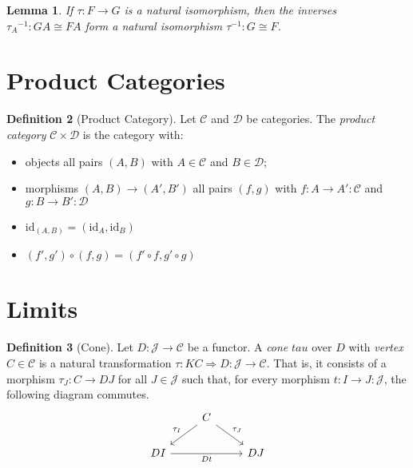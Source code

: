 \documentclass{book}
\newtheorem{lm}{Lemma}[chapter]
\theoremstyle{definition}
\newtheorem{df}[lm]{Definition}
\newcommand{\id}[1]{\ensuremath{\mathrm{id}_{#1}}}
\newcommand{\inv}[1]{\ensuremath{{#1}^{-1}}}
\begin{document}
  \begin{lm}
    If $\tau : F \rightarrow G$ is a natural isomorphism, then the inverses 
    $\inv{\tau_A} : GA \cong FA$ form a natural isomorphism $\inv{\tau} : G 
    \cong 
    F$.
  \end{lm}
  
  \section{Product Categories}
  
  \begin{df}[Product Category]
    Let $\mathcal{C}$ and $\mathcal{D}$ be categories. The \emph{product 
      category} 
    $\mathcal{C} \times \mathcal{D}$ is the category with:
    \begin{itemize}
      \item objects all pairs $(A, B)$ with $A \in \mathcal{C}$ and $B \in 
      \mathcal{D}$;
      \item morphisms $(A, B) \rightarrow (A', B')$ all pairs $(f, g)$ with $f : 
      A 
      \rightarrow A' : \mathcal{C}$ and $g : B \rightarrow B' : \mathcal{D}$
      \item $\id{(A, B)} = (\id{A}, \id{B})$
      \item $(f', g') \circ (f, g) = (f' \circ f, g' \circ g)$
    \end{itemize}
  \end{df}
  
  \section{Limits}
  
  \begin{df}[Cone]
    Let $D : \mathcal{J} \rightarrow \mathcal{C}$ be a functor. A \emph{cone} 
    $tau$ over $D$ with \emph{vertex} $C \in \mathcal{C}$ is a natural 
    transformation $\tau : K C \Rightarrow D : \mathcal{J} \rightarrow 
    \mathcal{C}$. That is, it consists of a
    morphism $\tau_J : C \rightarrow D J$ for all $J \in \mathcal{J}$ such that,
    for every morphism $t : I \rightarrow J : \mathcal{J}$, the following 
    diagram 
    commutes.
    \[ \begin{tikzcd}
      & C \ar[dl, "\tau_I"'] \ar[dr, "\tau_J"] & \\
      DI \ar[rr, "Dt"'] & & DJ
    \end{tikzcd} \]
  \end{df}
  
\end{document}
